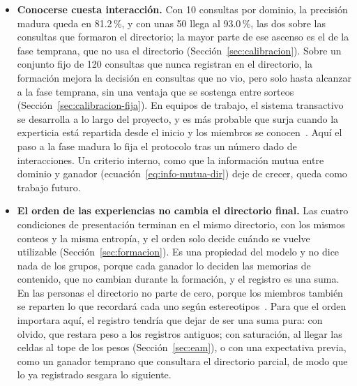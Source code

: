 \begin{itemize}
    \item \textbf{Conocerse cuesta interacción.}
    Con 10 consultas por dominio, la precisión madura queda en 81.2\,\%, y con unas 50
    llega al 93.0\,\%, las dos sobre las consultas que formaron el directorio; la mayor
    parte de ese ascenso es el de la fase temprana, que no usa el directorio
    (Sección~\ref{sec:calibracion}).
    Sobre un conjunto fijo de 120 consultas que nunca registran en el directorio, la
    formación mejora la decisión en consultas que no vio, pero solo hasta alcanzar a la
    fase temprana, sin una ventaja que se sostenga entre sorteos
    (Sección~\ref{sec:calibracion-fija}).
    En equipos de trabajo, el sistema transactivo se desarrolla a lo largo del proyecto,
    y es más probable que surja cuando la experticia está repartida desde el inicio y
    los miembros se conocen~\cite{lewis2004knowledge}.
    Aquí el paso a la fase madura lo fija el protocolo tras un número dado de
    interacciones.
    Un criterio interno, como que la información mutua entre dominio y ganador
    (ecuación~\eqref{eq:info-mutua-dir}) deje de crecer, queda como trabajo futuro.

    \item \textbf{El orden de las experiencias no cambia el directorio final.}
    Las cuatro condiciones de presentación terminan en el mismo directorio, con los
    mismos conteos y la misma entropía, y el orden solo decide cuándo se vuelve
    utilizable (Sección~\ref{sec:formacion}).
    Es una propiedad del modelo y no dice nada de los grupos, porque cada ganador lo
    deciden las memorias de contenido, que no cambian durante la formación, y el registro
    es una suma.
    En las personas el directorio no parte de cero, porque los miembros también se
    reparten lo que recordará cada uno según estereotipos~\cite{hollingshead2003gender}.
    Para que el orden importara aquí, el registro tendría que dejar de ser una suma
    pura: con olvido, que restara peso a los registros antiguos; con saturación, al
    llegar las celdas al tope de los pesos (Sección~\ref{sec:eam}), o con una expectativa
    previa, como un ganador temprano que consultara el directorio parcial, de modo que
    lo ya registrado sesgara lo siguiente.
\end{itemize}

